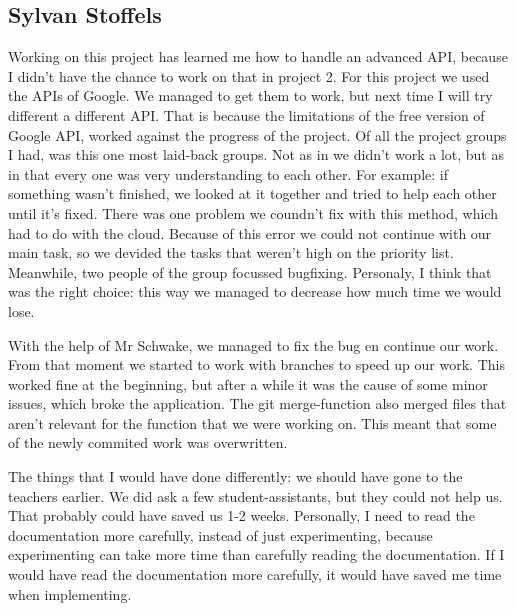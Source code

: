\documentclass{article}
\begin{document}
\subsection*{Sylvan Stoffels}
Working on this project has learned me how to handle an advanced API, because I didn't have the chance to work on that in project 2. For this project we used the APIs of Google. We managed to get them to work, but next time I will try different a different API. That is because the limitations of the free version of Google API, worked against the progress of the project.
Of all the project groups I had, was this one most laid-back groups. Not as in we didn't work a lot, but as in that every one was very understanding to each other. For example: if something wasn't finished, we looked at it together and tried to help each other until it's fixed. 
There was one problem we coundn't fix with this method, which had to do with the cloud. Because of this error we could not continue with our main task, so we devided the tasks that weren’t high on the priority list. Meanwhile, two people of the group focussed bugfixing. Personaly, I think that was the right choice: this way we managed to decrease how much time we would lose.

With the help of Mr Schwake, we managed to fix the bug en continue our work. From that moment we started to work with branches to speed up our work. This worked fine at the beginning, but after a while it was the cause of some minor issues, which broke the application. The git merge-function also merged files that aren't relevant for the function that we were working on. This meant that some of the newly commited work was overwritten.

The things that I would have done differently: we should have gone to the teachers earlier. We did ask a few student-assistants, but they could not help us. That probably could have saved us 1-2 weeks. Personally, I need to read the documentation more carefully, instead of just experimenting, because experimenting can take more time than carefully reading the documentation. If I would have read the documentation more carefully, it would have saved me time when implementing.
\end{document}
